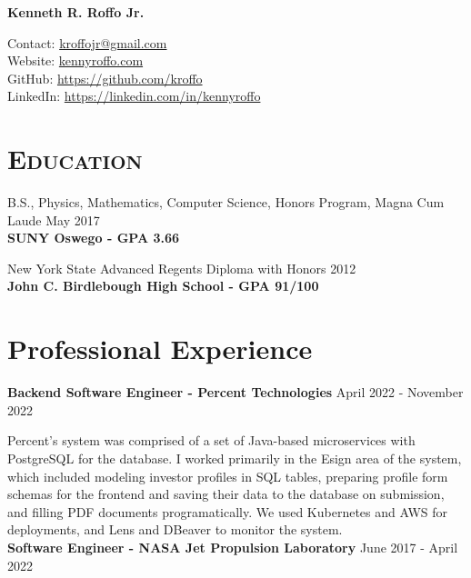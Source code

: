 \documentclass[8pt]{article}
\def\name{Kenneth R. Roffo Jr.}
\renewenvironment{itemize}{
  \begin{list}{}{
    \setlength{\leftmargin}{1.5em}
  }
}{
  \end{list}
}
\begin{document}
{\huge \bf \name}


Contact: \href{mailto:kroffojr@gmail.com}{kroffojr@gmail.com}\\
Website: \href{http://kennyroffo.com}{kennyroffo.com}\\
GitHub: \href{https://github.com/kroffo}{https://github.com/kroffo}\\
LinkedIn: \href{https://www.linkedin.com/in/kennyroffo}{https://linkedin.com/in/kennyroffo}

\section*{\textsc{Education}}

\begin{itemize}
  \item B.S., Physics, Mathematics, Computer Science, Honors Program, Magna Cum Laude \hfill May 2017\\
  \textbf{SUNY Oswego - GPA 3.66}
  \item New York State Advanced Regents Diploma with Honors \hfill 2012\\
  \textbf{John C. Birdlebough High School - GPA 91/100}
  \end{itemize}


\section*{Professional Experience}
\textbf{Backend Software Engineer - Percent Technologies} \hfill April 2022 - November 2022

Percent's system was comprised of a set of Java-based microservices with PostgreSQL for the database. I worked primarily in the Esign area of the system, which included modeling investor profiles in SQL tables,  preparing profile form schemas for the frontend and saving their data to the database on submission, and filling PDF documents programatically. We used Kubernetes and AWS for deployments, and Lens and DBeaver to monitor the system.\\

\textbf{Software Engineer - NASA Jet Propulsion Laboratory} \hfill June 2017 - April 2022
\end{document}

